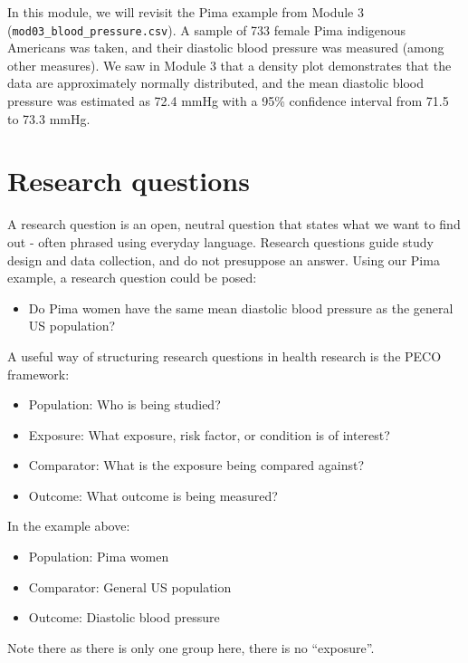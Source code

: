\documentclass[
  a4paper,
]{memoir}
\providecommand{\tightlist}{%
  \setlength{\itemsep}{0pt}\setlength{\parskip}{0pt}}
\begin{document}
In this module, we will revisit the Pima example from Module 3
(\texttt{mod03\_blood\_pressure.csv}). A sample of 733 female Pima
indigenous Americans was taken, and their diastolic blood pressure was
measured (among other measures). We saw in Module 3 that a density plot
demonstrates that the data are approximately normally distributed, and
the mean diastolic blood pressure was estimated as 72.4 mmHg with a 95\%
confidence interval from 71.5 to 73.3 mmHg.

\section{Research questions}\label{research-questions}

A research question is an open, neutral question that states what we
want to find out - often phrased using everyday language. Research
questions guide study design and data collection, and do not presuppose
an answer. Using our Pima example, a research question could be posed:

\begin{itemize}
\tightlist
\item
  Do Pima women have the same mean diastolic blood pressure as the
  general US population?
\end{itemize}

A useful way of structuring research questions in health research is the
PECO framework:

\begin{itemize}
\tightlist
\item
  Population: Who is being studied?
\item
  Exposure: What exposure, risk factor, or condition is of interest?
\item
  Comparator: What is the exposure being compared against?
\item
  Outcome: What outcome is being measured?
\end{itemize}

In the example above:

\begin{itemize}
\tightlist
\item
  Population: Pima women
\item
  Comparator: General US population
\item
  Outcome: Diastolic blood pressure
\end{itemize}

Note there as there is only one group here, there is no ``exposure''.
\end{document}
